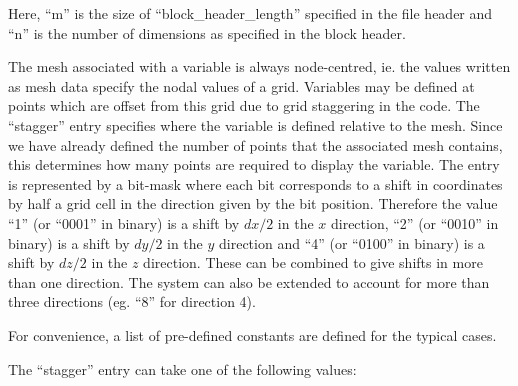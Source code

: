 \documentclass[12pt]{article}
\begin{document}
Here, ``m'' is the size of ``block\_header\_length'' specified in the file
header and ``n'' is the number of dimensions as specified in the block header.

The mesh associated with a variable is always node-centred, ie. the values
written as mesh data specify the nodal values of a grid. Variables may be
defined at points which are offset from this grid due to grid staggering in
the code. The ``stagger'' entry specifies where the variable is defined
relative to the mesh. Since we have already defined the number of points
that the associated mesh contains, this determines how many points are required
to display the variable. The entry is represented by a bit-mask where each
bit corresponds to a shift in coordinates by half a grid cell in the direction
given by the bit position. Therefore the value ``1'' (or ``0001'' in binary)
is a shift by $dx/2$ in the $x$ direction, ``2'' (or ``0010'' in binary) is
a shift by $dy/2$ in the $y$ direction and ``4'' (or ``0100'' in binary) is
a shift by $dz/2$ in the $z$ direction. These can be combined to give shifts
in more than one direction. The system can also be extended to account for
more than three directions (eg. ``8'' for direction 4).

For convenience, a list of pre-defined constants are defined for the typical
cases.

The ``stagger'' entry can take one of the following values:\\
\end{document}
